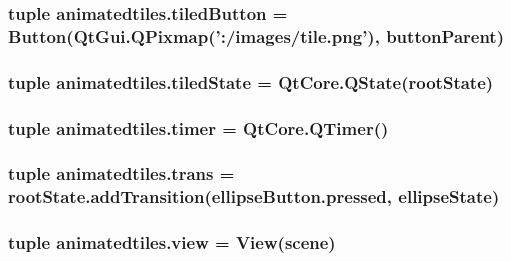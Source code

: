 \subsubsection[{tiled\+Button}]{\setlength{\rightskip}{0pt plus 5cm}tuple animatedtiles.\+tiled\+Button = {\bf Button}(Qt\+Gui.\+Q\+Pixmap('\+:/images/tile.\+png'), {\bf button\+Parent})}\label{namespaceanimatedtiles_abb2947b32ad817e5c844b47f587e6b3f}
\hypertarget{namespaceanimatedtiles_a869dd15a1efe39587739506e4cbdf7b9}{}
\subsubsection[{tiled\+State}]{\setlength{\rightskip}{0pt plus 5cm}tuple animatedtiles.\+tiled\+State = Qt\+Core.\+Q\+State({\bf root\+State})}\label{namespaceanimatedtiles_a869dd15a1efe39587739506e4cbdf7b9}
\hypertarget{namespaceanimatedtiles_a0c37e47c05cd863ff80fa18ff881e92d}{}
\subsubsection[{timer}]{\setlength{\rightskip}{0pt plus 5cm}tuple animatedtiles.\+timer = Qt\+Core.\+Q\+Timer()}\label{namespaceanimatedtiles_a0c37e47c05cd863ff80fa18ff881e92d}
\hypertarget{namespaceanimatedtiles_af1bb7d953d2aca57c73a99e7968a4851}{}
\subsubsection[{trans}]{\setlength{\rightskip}{0pt plus 5cm}tuple animatedtiles.\+trans = root\+State.\+add\+Transition(ellipse\+Button.\+pressed, {\bf ellipse\+State})}\label{namespaceanimatedtiles_af1bb7d953d2aca57c73a99e7968a4851}
\hypertarget{namespaceanimatedtiles_a1a76cb9d1e9dc29d1ce717674c9242b2}{}
\subsubsection[{view}]{\setlength{\rightskip}{0pt plus 5cm}tuple animatedtiles.\+view = {\bf View}({\bf scene})}\label{namespaceanimatedtiles_a1a76cb9d1e9dc29d1ce717674c9242b2}
